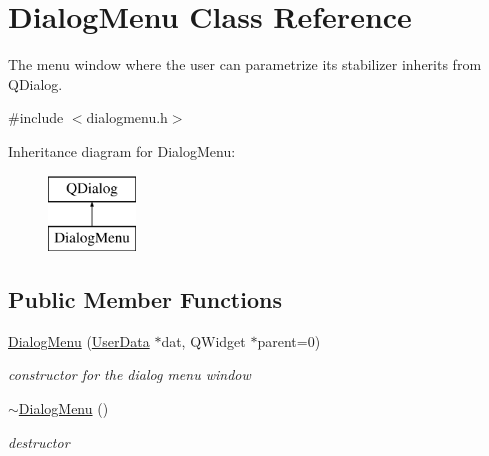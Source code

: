 \hypertarget{class_dialog_menu}{\section{Dialog\-Menu Class Reference}
\label{class_dialog_menu}
}


The menu window where the user can parametrize its stabilizer inherits from Q\-Dialog.  




{\ttfamily \#include $<$dialogmenu.\-h$>$}

Inheritance diagram for Dialog\-Menu\-:\begin{figure}[H]
\begin{center}
\leavevmode
\includegraphics[height=2.000000cm]{class_dialog_menu}
\end{center}
\end{figure}
\subsection*{Public Member Functions}
\begin{DoxyCompactItemize}
\item 
\hyperlink{class_dialog_menu_a8aea7c9bd35ced81a5f6b14414e104fa}{Dialog\-Menu} (\hyperlink{class_user_data}{User\-Data} $\ast$dat, Q\-Widget $\ast$parent=0)
\begin{DoxyCompactList}\small\item\em constructor for the dialog menu window \end{DoxyCompactList}\item 
\hypertarget{class_dialog_menu_a5d6d2dbc1a3ceeefa172284963afe974}{\hyperlink{class_dialog_menu_a5d6d2dbc1a3ceeefa172284963afe974}{$\sim$\-Dialog\-Menu} ()}\label{class_dialog_menu_a5d6d2dbc1a3ceeefa172284963afe974}

\begin{DoxyCompactList}\small\item\em destructor \end{DoxyCompactList}\end{DoxyCompactItemize}
